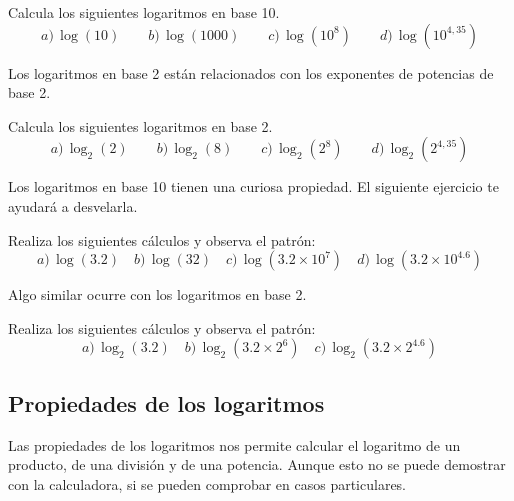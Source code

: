 \documentclass[12pt]{article}
\newenvironment{capitulo}{\begin{tcolorbox}[colback=blue!5!white,colframe=red!75!black]}{\end{tcolorbox}\bigskip}
\newenvironment{ejer}{\begin{tcolorbox}[center title, 
fonttitle=\sffamily\bfseries,colback=blue!5,colframe=orange]}{\end{tcolorbox}}
\begin{document}
\begin{ejer}

Calcula los siguientes logaritmos en base 10.
\[
a)\, \log(10)\qquad b)\, \log(1000)\qquad c)\, \log\left(10^8\right) \qquad d)\, \log\left(10^{4,35}\right)
\]

\end{ejer}

Los logaritmos en base 2 están relacionados con los exponentes de potencias de base 2.

\begin{ejer}

Calcula los siguientes logaritmos en base 2.
\[
a)\, \log_2(2)\qquad b)\, \log_2(8)\qquad c)\, \log_2\left(2^8\right) \qquad d)\, \log_2\left(2^{4,35}\right)
\]

\end{ejer}

Los logaritmos en base 10 tienen una curiosa propiedad. El siguiente ejercicio te ayudará a desvelarla.

\begin{ejer}

Realiza los siguientes cálculos y observa el patrón:
\[
a)\, \log(3.2) \quad b)\, \log(32) \quad c)\, \log\left(3.2 \times 10^7\right) \quad d)\, \log\left(3.2 \times 10^{4.6}\right)
\]

\end{ejer}

Algo similar ocurre con los logaritmos en base 2.

\begin{ejer}

Realiza los siguientes cálculos y observa el patrón:
\[
a)\, \log_2(3.2) \quad b)\, \log_2\left(3.2\times 2^6\right) \quad c)\, \log_2\left(3.2 \times 2^{4.6}\right) 
\]

\end{ejer}


\newpage

\begin{capitulo}
\section*{Propiedades de los logaritmos}
\end{capitulo}

Las propiedades de los logaritmos nos permite calcular el logaritmo de un producto, de una división y de una potencia. Aunque esto no se puede demostrar con la calculadora, si se pueden comprobar en casos particulares.
\end{document}

